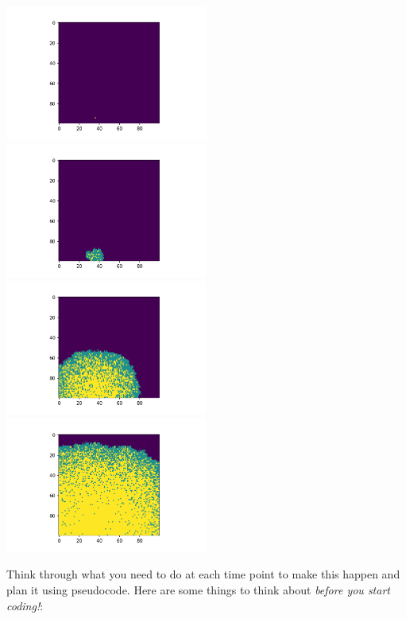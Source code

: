 \documentclass[pdflatex,a4paper]{article}
\begin{document}
\begin{itemize}
\begin{minipage}{\textwidth}
\includegraphics[width=0.5\textwidth]{spatial_SIR0.png}
\includegraphics[width=0.5\textwidth]{spatial_SIR10.png} \\
\includegraphics[width=0.5\textwidth]{spatial_SIR50.png}
\includegraphics[width=0.5\textwidth]{spatial_SIR100.png}
\end{minipage}




Think through what you need to do at each time point to make this happen and plan it using pseudocode. Here are some things to think about \emph{before you start coding!}:


\end{itemize}
\end{document}
